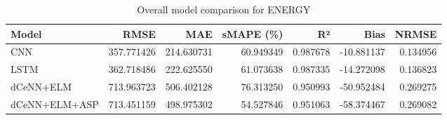 \begin{table}
\caption{Overall model comparison for ENERGY}
\begin{tabular}{lrrrrrr}
\toprule
Model & RMSE & MAE & sMAPE (\%) & R² & Bias & NRMSE \\
\midrule
CNN & 357.771426 & 214.630731 & 60.949349 & 0.987678 & -10.881137 & 0.134956 \\
LSTM & 362.718486 & 222.625550 & 61.073638 & 0.987335 & -14.272098 & 0.136823 \\
dCeNN+ELM & 713.963723 & 506.402128 & 76.313250 & 0.950993 & -50.952484 & 0.269275 \\
dCeNN+ELM+ASP & 713.451159 & 498.975302 & 54.527846 & 0.951063 & -58.374467 & 0.269082 \\
\bottomrule
\end{tabular}
\end{table}
